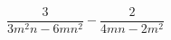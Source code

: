 \begin{ex}
	\begin{condition}
		\( \dfrac{3}{3m^2n-6mn^2}-\dfrac{2}{4mn-2m^2} \)
	\end{condition}
\end{ex}
